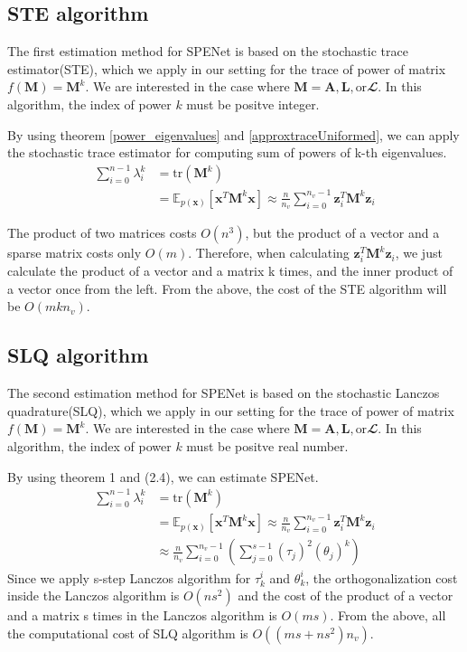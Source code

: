 \documentclass[senior,final,11pt]{iscs-thesis}
\begin{document}
\subsection{STE algorithm}
The first estimation method for SPENet is based on the stochastic trace estimator(STE), which we apply in our setting for the trace of power of matrix $f({\mathbf M})={\mathbf M}^k$. We are interested in the case where ${\mathbf M} = {\mathbf A}, {\mathbf L}, \text{or} {\mathbfcal L}$. In this algorithm, the index of power $k$ must be positve integer.

By using theorem \ref{power_eigenvalues} and \ref{approxtraceUniformed}, we can apply the stochastic trace estimator for computing sum of powers of k-th eigenvalues.
\begin{align}
    \sum_{i=0}^{n-1} \lambda_i^k &= \mathrm{tr}({\mathbf M}^k)  \nonumber\\
    &= \mathbb{E}_{p(\mathbf{x})}[\mathbf{x}^{T}{\mathbf M}^k \mathbf{x}] \approx \frac{n}{n_v}\sum_{i=0}^{n_v-1} \mathbf{z}_i^{T}{\mathbf M}^k\mathbf{z}_i
\end{align}

The product of two matrices costs $O(n^3)$, but the product of a vector and a sparse matrix costs only $O(m)$. Therefore, when calculating $\mathbf{z}_i^{T}{\mathbf M}^k\mathbf{z}_i$, we just calculate the product of a vector and a matrix k times, and the inner product of a vector once from the left. From the above, the cost of the STE algorithm will be $O(mkn_v)$.


\subsection{SLQ algorithm}
The second estimation method for SPENet is based on the stochastic Lanczos quadrature(SLQ), which we apply in our setting for the trace of power of matrix $f({\mathbf M})={\mathbf M}^k$. We are interested in the case where ${\mathbf M} = {\mathbf A}, {\mathbf L}, \text{or} {\mathbfcal L}$. In this algorithm, the index of power $k$ must be positve real number.

By using theorem 1 and (2.4), we can estimate SPENet.
\begin{align}
    \sum_{i=0}^{n-1} \lambda_i^k &= \mathrm{tr}({\mathbf M}^k)  \nonumber\\
    &= \mathbb{E}_{p(\mathbf{x})}[\mathbf{x}^{T}{\mathbf M}^k \mathbf{x}] \approx \frac{n}{n_v}\sum_{i=0}^{n_v-1} \mathbf{z}_i^{T}{\mathbf M}^k\mathbf{z}_i \nonumber\\
    &\approx \frac{n}{n_v} \sum_{i=0}^{n_v-1}\left(\sum_{j=0}^{s-1} (\tau_j)^2 (\theta_j)^k \right)
\end{align}
Since we apply s-step Lanczos algorithm for $\tau_k^i$ and $\theta_k^i$, the orthogonalization cost inside the Lanczos algorithm is $O(ns^2)$ and the cost of the product of a vector and a matrix s times in the Lanczos algorithm is $O(ms)$. From the above, all the computational cost of SLQ algorithm is $O((ms+ns^2)n_v)$.
\end{document}
